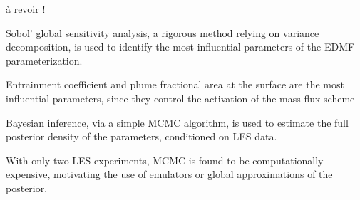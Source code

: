\documentclass[draft]{agujournal2019}
\newcommand{\blu}[1]{{\color{BlueGreen} #1}}
\begin{document}



\begin{keypoints}
    \item \blu{à revoir !}
    \item Sobol' global sensitivity analysis, a rigorous method relying on variance decomposition, is used to identify the most influential parameters of the EDMF parameterization. 
    \item Entrainment coefficient and plume fractional area at the surface are the most influential parameters, since they control the activation of the mass-flux scheme
    \item Bayesian inference, via a simple MCMC algorithm, is used to estimate the full posterior density of the parameters, conditioned on LES data.
    \item With only two LES experiments, MCMC is found to be computationally expensive, motivating the use of emulators or global approximations of the posterior.
\end{keypoints}

%
%

%
%
\end{document}
